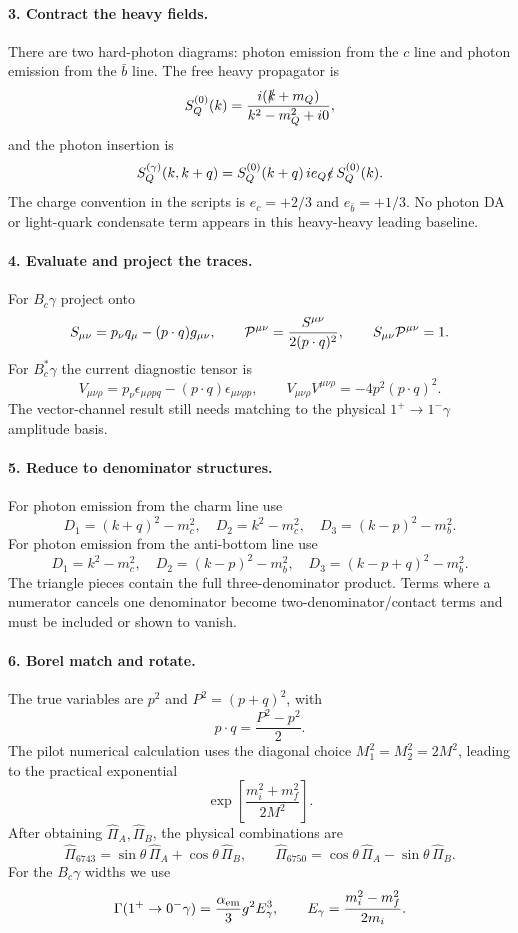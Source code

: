 \documentclass[11pt]{article}
\newcommand{\Slash}[1]{\slashed{#1}}
\begin{document}
\paragraph{3. Contract the heavy fields.}
There are two hard-photon diagrams: photon emission from the \(c\) line and
photon emission from the \(\bar b\) line.  The free heavy propagator is
\[
S_Q^{(0)}(k)=\frac{i(\Slash{k}+m_Q)}{k^2-m_Q^2+i0},
\]
and the photon insertion is
\[
S_Q^{(\gamma)}(k,k+q)=
S_Q^{(0)}(k+q)\,i e_Q\Slash{\epsilon}\,S_Q^{(0)}(k).
\]
The charge convention in the scripts is \(e_c=+2/3\) and
\(e_{\bar b}=+1/3\).  No photon DA or light-quark condensate term appears in
this heavy-heavy leading baseline.

\paragraph{4. Evaluate and project the traces.}
For \(B_c\gamma\) project onto
\[
S_{\mu\nu}=p_\nu q_\mu-(p\cdot q)g_{\mu\nu},
\qquad
{\cal P}^{\mu\nu}=\frac{S^{\mu\nu}}{2(p\cdot q)^2},
\qquad
S_{\mu\nu}{\cal P}^{\mu\nu}=1 .
\]
For \(B_c^\ast\gamma\) the current diagnostic tensor is
\[
V_{\mu\nu\rho}=p_\nu\epsilon_{\mu\rho p q}
-(p\cdot q)\epsilon_{\mu\nu\rho p},
\qquad
V_{\mu\nu\rho}V^{\mu\nu\rho}=-4p^2(p\cdot q)^2 .
\]
The vector-channel result still needs matching to the physical
\(1^+\to1^-\gamma\) amplitude basis.

\paragraph{5. Reduce to denominator structures.}
For photon emission from the charm line use
\[
D_1=(k+q)^2-m_c^2,\quad D_2=k^2-m_c^2,\quad
D_3=(k-p)^2-m_b^2.
\]
For photon emission from the anti-bottom line use
\[
D_1=k^2-m_c^2,\quad D_2=(k-p)^2-m_b^2,\quad
D_3=(k-p+q)^2-m_b^2.
\]
The triangle pieces contain the full three-denominator product.  Terms where a
numerator cancels one denominator become two-denominator/contact terms and
must be included or shown to vanish.

\paragraph{6. Borel match and rotate.}
The true variables are \(p^2\) and \(P^2=(p+q)^2\), with
\[
p\cdot q=\frac{P^2-p^2}{2}.
\]
The pilot numerical calculation uses the diagonal choice \(M_1^2=M_2^2=2M^2\),
leading to the practical exponential
\[
\exp\left[\frac{m_i^2+m_f^2}{2M^2}\right].
\]
After obtaining \(\widehat\Pi_A,\widehat\Pi_B\), the physical combinations are
\[
\widehat\Pi_{6743}=\sin\theta\,\widehat\Pi_A+\cos\theta\,\widehat\Pi_B,
\qquad
\widehat\Pi_{6750}=\cos\theta\,\widehat\Pi_A-\sin\theta\,\widehat\Pi_B .
\]
For the \(B_c\gamma\) widths we use
\[
\Gamma(1^+\to0^-\gamma)=
\frac{\alpha_{\rm em}}{3}g^2E_\gamma^3,\qquad
E_\gamma=\frac{m_i^2-m_f^2}{2m_i}.
\]
\end{document}
